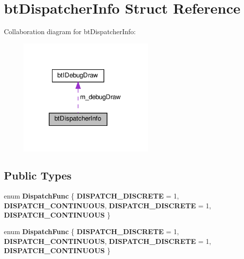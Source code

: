 \hypertarget{structbtDispatcherInfo}{}\section{bt\+Dispatcher\+Info Struct Reference}
\label{structbtDispatcherInfo}


Collaboration diagram for bt\+Dispatcher\+Info\+:
\nopagebreak
\begin{figure}[H]
\begin{center}
\leavevmode
\includegraphics[width=192pt]{structbtDispatcherInfo__coll__graph}
\end{center}
\end{figure}
\subsection*{Public Types}
\begin{DoxyCompactItemize}
\item 
\mbox{\label{structbtDispatcherInfo_a04d1f989a83ef1bb12cf7f4837de8cea}} 
enum {\bfseries Dispatch\+Func} \{ {\bfseries D\+I\+S\+P\+A\+T\+C\+H\+\_\+\+D\+I\+S\+C\+R\+E\+TE} = 1, 
{\bfseries D\+I\+S\+P\+A\+T\+C\+H\+\_\+\+C\+O\+N\+T\+I\+N\+U\+O\+US}, 
{\bfseries D\+I\+S\+P\+A\+T\+C\+H\+\_\+\+D\+I\+S\+C\+R\+E\+TE} = 1, 
{\bfseries D\+I\+S\+P\+A\+T\+C\+H\+\_\+\+C\+O\+N\+T\+I\+N\+U\+O\+US}
 \}
\item 
\mbox{\label{structbtDispatcherInfo_a04d1f989a83ef1bb12cf7f4837de8cea}} 
enum {\bfseries Dispatch\+Func} \{ {\bfseries D\+I\+S\+P\+A\+T\+C\+H\+\_\+\+D\+I\+S\+C\+R\+E\+TE} = 1, 
{\bfseries D\+I\+S\+P\+A\+T\+C\+H\+\_\+\+C\+O\+N\+T\+I\+N\+U\+O\+US}, 
{\bfseries D\+I\+S\+P\+A\+T\+C\+H\+\_\+\+D\+I\+S\+C\+R\+E\+TE} = 1, 
{\bfseries D\+I\+S\+P\+A\+T\+C\+H\+\_\+\+C\+O\+N\+T\+I\+N\+U\+O\+US}
 \}
\end{DoxyCompactItemize}
